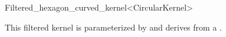 \begin{ccRefClass}{Filtered_hexagon_curved_kernel<CircularKernel>}

\ccDefinition



\ccParameters

This filtered kernel is parameterized by and derives from a . 

\ccInheritsFrom

\end{ccRefClass}
